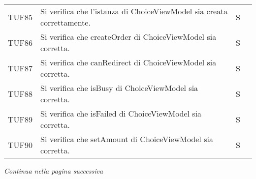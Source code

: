 \begin{table}[H]
\begin{tabular}{c|p{8cm}|c|c}
    TUF85 & Si verifica che l'istanza di ChoiceViewModel sia creata correttamente.                                                                  & S \\
    TUF86 & Si verifica che createOrder di ChoiceViewModel sia corretta. & S \\
    TUF87 & Si verifica che canRedirect di ChoiceViewModel sia corretta. & S \\
    TUF88 & Si verifica che isBusy di ChoiceViewModel sia corretta. & S \\
    TUF89 & Si verifica che isFailed di ChoiceViewModel sia corretta. & S \\
    TUF90 & Si verifica che setAmount di ChoiceViewModel sia corretta. & S \\
  \end{tabular}
\end{table}
\begin{center}
  \textit{\small Continua nella pagina successiva}
\end{center}

